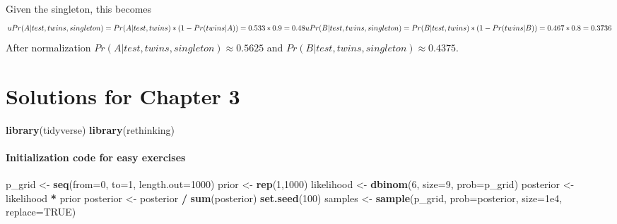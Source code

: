 \documentclass[
]{book}
\newenvironment{Shaded}{\begin{snugshade}}{\end{snugshade}}
\newcommand{\DataTypeTok}[1]{\textcolor[rgb]{0.13,0.29,0.53}{#1}}
\newcommand{\DecValTok}[1]{\textcolor[rgb]{0.00,0.00,0.81}{#1}}
\newcommand{\FloatTok}[1]{\textcolor[rgb]{0.00,0.00,0.81}{#1}}
\newcommand{\KeywordTok}[1]{\textcolor[rgb]{0.13,0.29,0.53}{\textbf{#1}}}
\newcommand{\NormalTok}[1]{#1}
\newcommand{\OperatorTok}[1]{\textcolor[rgb]{0.81,0.36,0.00}{\textbf{#1}}}
\newcommand{\OtherTok}[1]{\textcolor[rgb]{0.56,0.35,0.01}{#1}}
\newcommand{\StringTok}[1]{\textcolor[rgb]{0.31,0.60,0.02}{#1}}
\begin{document}
Given the singleton, this becomes
\[uPr(A | test, twins, singleton) = Pr(A | test, twins) * (1 - Pr(twins | A)) = 0.533 * 0.9 = 0.48\\
uPr(B | test, twins, singleton) = Pr(B | test, twins) * (1 - Pr(twins | B)) = 0.467 * 0.8 = 0.3736\]
After normalization \(Pr(A | test, twins, singleton) \approx 0.5625\) and \(Pr(B | test, twins, singleton) \approx 0.4375\).

\hypertarget{solutions-for-chapter-3}{%
\chapter{Solutions for Chapter 3}\label{solutions-for-chapter-3}}

\begin{Shaded}
\begin{Highlighting}[]
\KeywordTok{library}\NormalTok{(tidyverse)}
\KeywordTok{library}\NormalTok{(rethinking)}
\end{Highlighting}
\end{Shaded}

\hypertarget{initialization-code-for-easy-exercises}{%
\subsubsection{Initialization code for easy exercises}\label{initialization-code-for-easy-exercises}}

\begin{Shaded}
\begin{Highlighting}[]
\NormalTok{p\_grid \textless{}{-}}\StringTok{ }\KeywordTok{seq}\NormalTok{(}\DataTypeTok{from=}\DecValTok{0}\NormalTok{, }\DataTypeTok{to=}\DecValTok{1}\NormalTok{, }\DataTypeTok{length.out=}\DecValTok{1000}\NormalTok{)}
\NormalTok{prior \textless{}{-}}\StringTok{ }\KeywordTok{rep}\NormalTok{(}\DecValTok{1}\NormalTok{,}\DecValTok{1000}\NormalTok{)}
\NormalTok{likelihood \textless{}{-}}\StringTok{ }\KeywordTok{dbinom}\NormalTok{(}\DecValTok{6}\NormalTok{, }\DataTypeTok{size=}\DecValTok{9}\NormalTok{, }\DataTypeTok{prob=}\NormalTok{p\_grid)}
\NormalTok{posterior \textless{}{-}}\StringTok{ }\NormalTok{likelihood }\OperatorTok{*}\StringTok{ }\NormalTok{prior}
\NormalTok{posterior \textless{}{-}}\StringTok{ }\NormalTok{posterior }\OperatorTok{/}\StringTok{ }\KeywordTok{sum}\NormalTok{(posterior)}
\KeywordTok{set.seed}\NormalTok{(}\DecValTok{100}\NormalTok{)}
\NormalTok{samples \textless{}{-}}\StringTok{ }\KeywordTok{sample}\NormalTok{(p\_grid, }\DataTypeTok{prob=}\NormalTok{posterior, }\DataTypeTok{size=}\FloatTok{1e4}\NormalTok{, }\DataTypeTok{replace=}\OtherTok{TRUE}\NormalTok{)}
\end{Highlighting}
\end{Shaded}
\end{document}
